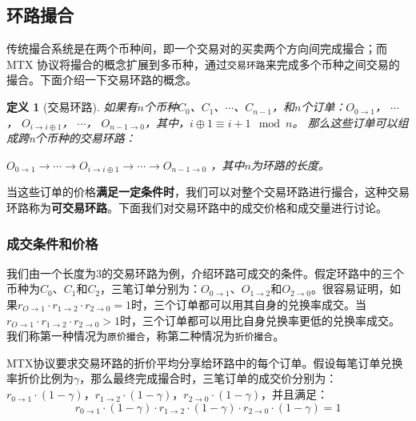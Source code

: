 \documentclass[UTF8,nofonts]{ctexart}
\newtheorem{definition}{定义}[section]
\begin{document}
\subsection{环路撮合}

传统撮合系统是在两个币种间，即一个交易对的买卖两个方向间完成撮合；而MTX 协议将撮合的概念扩展到多币种，通过\texttt{交易环路}来完成多个币种之间交易的撮合。下面介绍一下交易环路的概念。

\begin{definition}[交易环路]
如果有$n$个币种$C_{0}$、$C_{1}$、$\cdots$、$C_{n-1}$，和$n$个订单：$O_{0\rightarrow 1}$， $\cdots$， $O_{i\rightarrow i\oplus 1}$， $\cdots$， $O_{n-1 \rightarrow 0}$，其中，$i\oplus 1 \equiv i+1 \mod n$。
那么这些订单可以组成跨n个币种的交易环路：

$O_{0\rightarrow 1} \rightarrow \cdots \rightarrow O_{i\rightarrow i\oplus 1} \rightarrow \cdots \rightarrow O_{n-1\rightarrow 0}$ ，其中$n$为环路的长度。
\end{definition}

当这些订单的价格\textbf{满足一定条件时}，我们可以对整个交易环路进行撮合，这种交易环路称为\textbf{可交易环路}。下面我们对交易环路中的成交价格和成交量进行讨论。


\subsubsection{成交条件和价格\label{sec:matchprice}}

我们由一个长度为3的交易环路为例，介绍环路可成交的条件。假定环路中的三个币种为$C_{0}$、$C_{1}$和$C_{2}$，三笔订单分别为：$O_{0\rightarrow 1}$、$O_{1 \rightarrow 2}$和$O_{2 \rightarrow 0}$。很容易证明，如果$r_{O \rightarrow 1} \cdot r_{1 \rightarrow 2}\cdot r_{2 \rightarrow 0} = 1$时，三个订单都可以用其自身的兑换率成交。当$r_{O \rightarrow 1} \cdot r_{1 \rightarrow 2}\cdot r_{2 \rightarrow 0} > 1$时，三个订单都可以用比自身兑换率更低的兑换率成交。我们称第一种情况为\texttt{原价撮合}，称第二种情况为\texttt{折价撮合}。

MTX协议要求交易环路的折价平均分享给环路中的每个订单。假设每笔订单兑换率折价比例为$\gamma$，那么最终完成撮合时，三笔订单的成交价分别为：$r_{0\rightarrow 1} \cdot (1-\gamma)$，$r_{1\rightarrow 2} \cdot (1-\gamma)$，$r_{2 \rightarrow 0} \cdot (1-\gamma)$，并且满足：
\begin{equation}
r_{0\rightarrow 1} \cdot (1-\gamma)\cdot r_{1\rightarrow 2} \cdot (1-\gamma) \cdot r_{2 \rightarrow 0} \cdot (1-\gamma) = 1
\end{equation}
\end{document}
